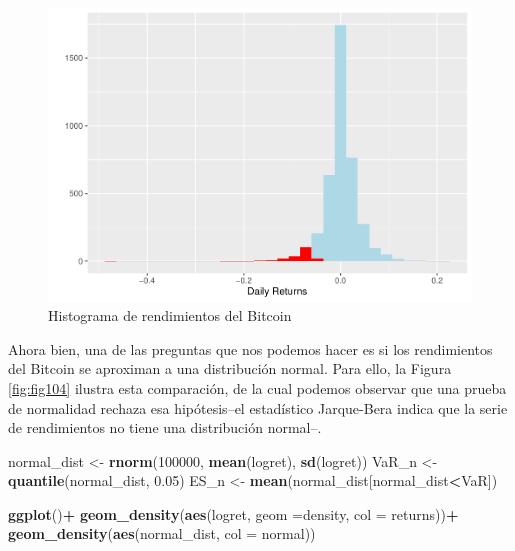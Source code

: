 \documentclass[
]{book}
\newenvironment{Shaded}{\begin{snugshade}}{\end{snugshade}}
\newcommand{\AttributeTok}[1]{\textcolor[rgb]{0.13,0.29,0.53}{#1}}
\newcommand{\DecValTok}[1]{\textcolor[rgb]{0.00,0.00,0.81}{#1}}
\newcommand{\FloatTok}[1]{\textcolor[rgb]{0.00,0.00,0.81}{#1}}
\newcommand{\FunctionTok}[1]{\textcolor[rgb]{0.13,0.29,0.53}{\textbf{#1}}}
\newcommand{\NormalTok}[1]{#1}
\newcommand{\OtherTok}[1]{\textcolor[rgb]{0.56,0.35,0.01}{#1}}
\newcommand{\SpecialCharTok}[1]{\textcolor[rgb]{0.81,0.36,0.00}{\textbf{#1}}}
\newcommand{\StringTok}[1]{\textcolor[rgb]{0.31,0.60,0.02}{#1}}
\begin{document}
\begin{figure}

{\centering \includegraphics{Notas-Series-Tiempo_files/figure-latex/fig103-1} 

}

\caption{Histograma de rendimientos del Bitcoin}\label{fig:fig103}
\end{figure}

Ahora bien, una de las preguntas que nos podemos hacer es si los rendimientos del Bitcoin se aproximan a una distribución normal. Para ello, la Figura \ref{fig:fig104} ilustra esta comparación, de la cual podemos observar que una prueba de normalidad rechaza esa hipótesis--el estadístico Jarque-Bera indica que la serie de rendimientos no tiene una distribución normal--.

\begin{Shaded}
\begin{Highlighting}[]
\NormalTok{normal\_dist }\OtherTok{\textless{}{-}} \FunctionTok{rnorm}\NormalTok{(}\DecValTok{100000}\NormalTok{, }\FunctionTok{mean}\NormalTok{(logret), }\FunctionTok{sd}\NormalTok{(logret))}
\NormalTok{VaR\_n }\OtherTok{\textless{}{-}} \FunctionTok{quantile}\NormalTok{(normal\_dist, }\FloatTok{0.05}\NormalTok{)}
\NormalTok{ES\_n }\OtherTok{\textless{}{-}} \FunctionTok{mean}\NormalTok{(normal\_dist[normal\_dist}\SpecialCharTok{\textless{}}\NormalTok{VaR])}
  
\FunctionTok{ggplot}\NormalTok{()}\SpecialCharTok{+}
  \FunctionTok{geom\_density}\NormalTok{(}\FunctionTok{aes}\NormalTok{(logret, }\AttributeTok{geom =}\StringTok{\textquotesingle{}density\textquotesingle{}}\NormalTok{, }\AttributeTok{col =} \StringTok{\textquotesingle{}returns\textquotesingle{}}\NormalTok{))}\SpecialCharTok{+}
  \FunctionTok{geom\_density}\NormalTok{(}\FunctionTok{aes}\NormalTok{(normal\_dist, }\AttributeTok{col =} \StringTok{\textquotesingle{}normal\textquotesingle{}}\NormalTok{))}
\end{Highlighting}
\end{Shaded}
\end{document}
